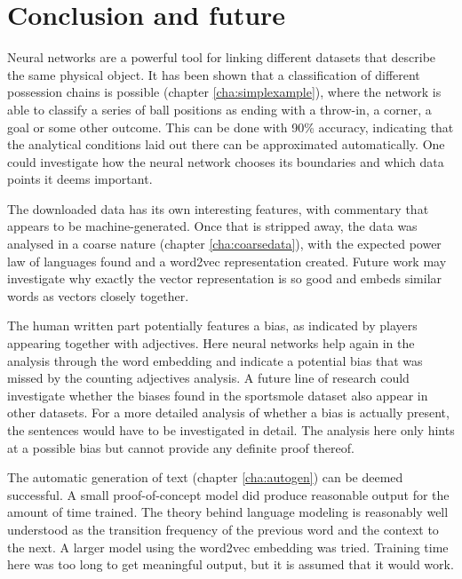 \documentclass[10pt, a4paper]{UUThesisTemplate}
\begin{document}

\chapter{Conclusion and future}

Neural networks are a powerful tool for linking different datasets that describe the same physical object. It has been shown that a classification of different possession chains is possible (chapter \ref{cha:simplexample}), where the network is able to classify a series of ball positions as ending with a throw-in, a corner, a goal or some other outcome. This can be done with 90\% accuracy, indicating that the analytical conditions laid out there can be approximated automatically. One could investigate how the neural network chooses its boundaries and which data points it deems important.

The downloaded data has its own interesting features, with commentary that appears to be machine-generated. Once that is stripped away, the data was analysed in a coarse nature (chapter \ref{cha:coarsedata}), with the expected power law of languages found and a word2vec representation created. Future work may investigate why exactly the vector representation is so good and embeds similar words as vectors closely together.

The human written part potentially features a bias, as indicated by players appearing together with adjectives. Here neural networks help again in the analysis through the word embedding and indicate a potential bias that was missed by the counting adjectives analysis. A future line of research could investigate whether the biases found in the sportsmole dataset also appear in other datasets. For a more detailed analysis of whether a bias is actually present, the sentences would have to be investigated in detail. The analysis here only hints at a possible bias but cannot provide any definite proof thereof.

The automatic generation of text (chapter \ref{cha:autogen}) can be deemed successful. A small proof-of-concept model did produce reasonable output for the amount of time trained. The theory behind language modeling is reasonably well understood as the transition frequency of the previous word and the context to the next. A larger model using the word2vec embedding was tried. Training time here was too long to get meaningful output, but it is assumed that it would work.
\end{document}
